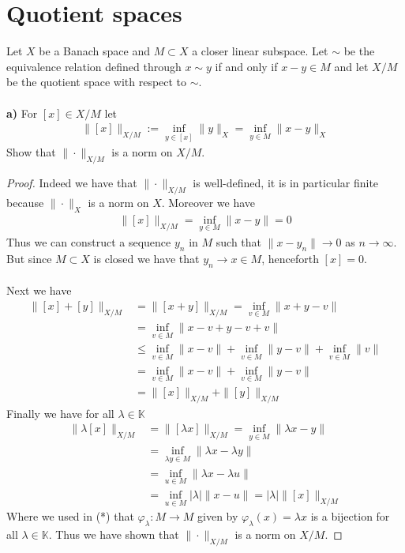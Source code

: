 \documentclass[12pt,a4paper]{article}
\author{Marco Bertenghi}
\theoremstyle{definition}
\begin{document}
\section{Quotient spaces}
Let $X$ be a Banach space and $M \subset X$ a closer linear subspace. Let $\sim$ be the equivalence relation defined through $x \sim y$ if and only if $x-y \in M$ and let $X/M$ be the quotient space with respect to $\sim.$
\\\\
\textbf{a)} For $[x] \in X/M$ let 
\begin{align*}
\|[x]\|_{X/M}:= \inf_{y \in [x]} \| y \|_X = \inf_{y \in M} \|x-y\|_X
\end{align*}
Show that $\| \cdot \|_{X/M}$ is a norm on $X/M$. 
\begin{proof}
Indeed we have that $\| \cdot \|_{X/M}$ is well-defined, it is in particular finite because $\| \cdot \|_X$ is a norm on $X$. Moreover we have
\begin{align*}
\| [x]\|_{X/M} = \inf_{y \in M} \|x-y\| = 0
\end{align*}
Thus we can construct a sequence $y_n$ in  $M$ such that $\|x-y_n\| \to 0 $ as $n \to \infty$. But since $M \subset X$ is closed we have that $y_n \to x \in M$, henceforth $[x]=0$. 
\\\\
Next we have
\begin{align*}
\| [x] + [y]\|_{X/M} &= \| [x+y]\|_{X/M} = \inf_{v \in M} \| x+y-v\| \\
&= \inf_{v \in M} \| x-v + y-v + v\| \\ 
& \leq \inf_{v \in M} \| x-v\| + \inf_{v \in M} \|y-v\| + \inf_{v \in M} \|v\| \\
& = \inf_{v \in M} \|x-v\| + \inf_{v \in M} \|y-v\|   \\
& 
= \| [x]\|_{X/M} + \|[y]\|_{X/M} 
\end{align*}
Finally we have for all $\lambda \in \mathbb{K}$
\begin{align*}
\| \lambda [x]\|_{X/M} &=  \|[ \lambda x] \|_{X/M} = \inf_{y \in M} \| \lambda x -y\|  \\
& = \inf_{ \lambda y  \in M} \| \lambda x - \lambda y\| \\
&= \inf_{u \in M} \| \lambda x - \lambda u\| \tag{*} \\
 & = \inf_{u \in M} | \lambda | \|x-u\| = | \lambda | \| [x] \|_{X/M} 
\end{align*}
 Where we used in (*) that $\varphi_\lambda : M \to M$ given by $ \varphi_\lambda(x)= \lambda x$ is a bijection for all $\lambda \in \mathbb{K}$. Thus we have shown that $\| \cdot \|_{X/M}$ is a norm on $X/M$. 
\end{proof}
\end{document}
